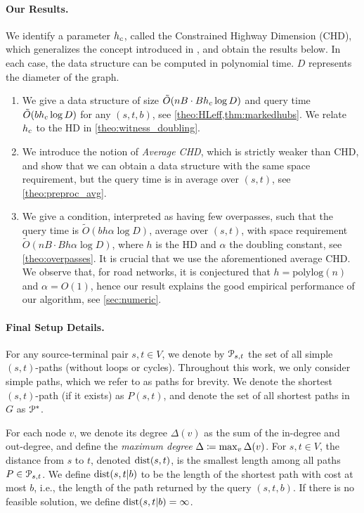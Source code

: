 \paragraph{Our Results.}
We identify a parameter $h_c$, called the Constrained Highway Dimension (CHD), which generalizes the concept introduced in \citep{hd_journal}, and obtain the results below.
In each case, the data structure can be computed in polynomial time.
$D$ represents the diameter of the graph.
\begin{enumerate}
\item We give a data structure of size $\tilde O(nB\cdot Bh_c\log D)$ and query time $\tilde O(bh_c\log D)$ for any $(s,t,b)$, see \cref{theo:HLeff,thm:markedhubs}.
We relate $h_c$ to the HD in \cref{theo:witness_doubling}.
\item We introduce the notion of \emph{Average CHD}, which is strictly weaker than CHD, and show that we can obtain a data structure with the same space requirement, but the query time is in average over $(s,t)$, see \cref{theo:preproc_avg}.
\item We give a condition, interpreted as having few overpasses, such that the query time is  $\tilde O(bh\alpha\log D)$, average over $(s,t)$, with space requirement $\tilde O(n B\cdot Bh\alpha\log D)$, where $h$ is the HD and $\alpha$ the doubling constant, see \cref{theo:overpasses}.
It is crucial that we use the aforementioned average CHD.
We observe that, for road networks, it is conjectured that $h=\text{polylog}(n)$ and $\alpha=O(1)$, hence our result explains the good empirical performance of our algorithm, see \cref{sec:numeric}.
\end{enumerate}


\medskip
\paragraph{Final Setup Details.}
For any source-terminal pair $s,t\in V$, we denote by $\mathcal{P}_{s,t}$ the set of all simple $(s,t)$-paths (without loops or cycles). 
Throughout this work, we only consider simple paths, which we refer to as paths for brevity.
We denote the shortest $(s,t)$-path (if it exists) as $P(s,t)$, and denote the set of all shortest paths in $G$ as $\mathcal{P}^*$.

For each node $v$, we denote its degree $\Delta(v)$ as the sum of the in-degree and out-degree, and define the \emph{maximum degree} $\Delta \coloneqq \max_v\Delta(v)$.
For $s,t\in V$, the distance from $s$ to $t$, denoted $\mbox{dist}(s,t)$, is the smallest length among all paths $P\in\mathcal{P}_{s,t}$.
We define $\mbox{dist}(s,t|b)$ to be the length of the shortest path with cost at most $b$, i.e., the length of the path returned by the query $(s,t,b)$.
If there is no feasible solution, we define $\mbox{dist}(s,t|b)=\infty$.

